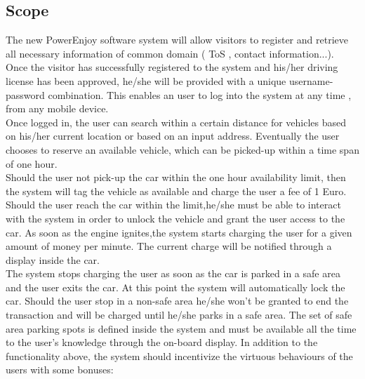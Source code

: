 \documentclass[12pt]{article}
\begin{document}
	 \subsection{\label{scope:1}Scope}
		The new PowerEnjoy software system will allow visitors to register and retrieve all 
		necessary information of common domain ( ToS , contact information...). \\Once the 
		visitor has successfully registered to the system and his/her driving license has been 
		approved, he/she will be provided with a unique username-password combination. This 
		enables an user to log into the system at any time , from any mobile device. \\Once 
		logged in, the user can search within a certain distance for vehicles based on his/her 
		current location or based on an input address. 
		Eventually the user chooses to reserve an available vehicle, which can be picked-up 
		within a time span of one hour.\\ 
		Should the user not pick-up the car within the one hour availability limit, then the 
		system will tag the vehicle as available and charge the user a fee of 1 Euro.\\
		Should the user reach the car within the limit,he/she must be able to  interact with 
		the system in order to unlock the vehicle and grant the user access to the car.
		As soon as the engine ignites,the system starts charging the user for a given amount of 
		money per minute. The current charge will be notified through a display inside the car.	
		\\
		The system stops charging the user as soon as the car is parked in a safe area and the 
		user exits the car. At this point the system will automatically lock the car.
		Should the user stop in a non-safe area he/she won't be granted to end the transaction 	
		and will be charged until  he/she parks in a safe area.
		The set of safe area parking spots is defined inside the system and must be available 	
		all the time to the user's knowledge through the on-board display.
		\newline
		In addition to the functionality above, the system should incentivize the virtuous 
		behaviours of the users with some bonuses:
\end{document}
